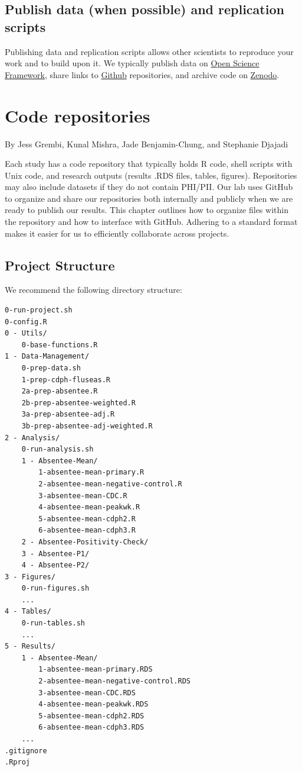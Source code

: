 \documentclass[
]{book}
\begin{document}
\section{Publish data (when possible) and replication scripts}\label{publish-data-when-possible-and-replication-scripts}

Publishing data and replication scripts allows other scientists to reproduce your work and to build upon it. We typically publish data on \href{osf.io}{Open Science Framework}, share links to \href{github.com}{Github} repositories, and archive code on \href{zenodo.org}{Zenodo}.

\chapter{Code repositories}\label{code-repositories}

By Jess Grembi, Kunal Mishra, Jade Benjamin-Chung, and Stephanie Djajadi

Each study has a code repository that typically holds R code, shell scripts with Unix code, and research outputs (results .RDS files, tables, figures). Repositories may also include datasets if they do not contain PHI/PII. Our lab uses GitHub to organize and share our repositories both internally and publicly when we are ready to publish our results.
This chapter outlines how to organize files within the repository and how to interface with GitHub. Adhering to a standard format makes it easier for us to efficiently collaborate across projects.

\section{Project Structure}\label{project-structure}

We recommend the following directory structure:

\begin{verbatim}
0-run-project.sh
0-config.R
0 - Utils/
    0-base-functions.R
1 - Data-Management/
    0-prep-data.sh
    1-prep-cdph-fluseas.R
    2a-prep-absentee.R
    2b-prep-absentee-weighted.R
    3a-prep-absentee-adj.R
    3b-prep-absentee-adj-weighted.R
2 - Analysis/
    0-run-analysis.sh
    1 - Absentee-Mean/
        1-absentee-mean-primary.R
        2-absentee-mean-negative-control.R
        3-absentee-mean-CDC.R
        4-absentee-mean-peakwk.R
        5-absentee-mean-cdph2.R
        6-absentee-mean-cdph3.R
    2 - Absentee-Positivity-Check/
    3 - Absentee-P1/
    4 - Absentee-P2/
3 - Figures/
    0-run-figures.sh
    ...
4 - Tables/
    0-run-tables.sh
    ...
5 - Results/
    1 - Absentee-Mean/
        1-absentee-mean-primary.RDS
        2-absentee-mean-negative-control.RDS
        3-absentee-mean-CDC.RDS
        4-absentee-mean-peakwk.RDS
        5-absentee-mean-cdph2.RDS
        6-absentee-mean-cdph3.RDS
    ...
.gitignore
.Rproj
\end{verbatim}
\end{document}
